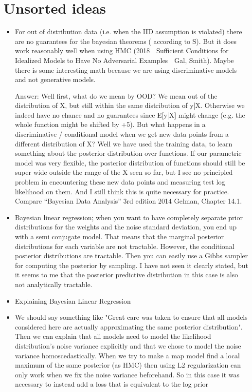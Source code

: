 \documentclass[12pt, A4, twoside]{report}
\begin{document}
\chapter{Unsorted ideas}
\begin{itemize}
  \item For out of distribution data (i.e. when the IID assumption is violated) there are no guarantees for the bayesian theorems ( according to S). But it does work reasonably well when using HMC (2018 | Sufficient Conditions for Idealized Models to Have No Adversarial Examples | Gal, Smith). Maybe there is some interesting math because we are using discriminative models and not generative models.
  
  Answer:
  Well first, what do we mean by OOD? We mean out of the distribution of X, but still within the same distribution of y|X. Otherwise we indeed have no chance and no guarantees since E[y|X] might change (e.g. the whole function might be shifted by +5). But what happens in a discriminative / conditional model when we get new data points from a different distribution of X? Well we have used the training data, to learn something about the posterior distribution over functions. If our parametric model was very flexible, the posterior distribution of functions should still be super wide outside the range of the X seen so far, but I see no principled problem in encountering these new data points and measuring test log likelihood on them. And I still think this is quite necessary for practice. Compare “Bayesian Data Analysis” 3rd edition 2014 Gelman, Chapter 14.1.
  \item Bayesian linear regression; when you want to have completely separate prior distributions for the weights and the noise standard deviation, you end up with a semi conjugate model. That means that the marginal posterior distributions for each variable are not tractable. However, the conditional posterior distributions are tractable. Then you can easily use a Gibbs sampler for computing the posterior by sampling. I have not seen it clearly stated, but it seems to me that the posterior predictive distribution in this case is also not analytically tractable.
  \item Explaining Bayesian Linear Regression
  \item We should say something like "Great care was taken to ensure that all models considered here are actually approximating the same posterior distribution". Then we can explain that all models need to model the likelihood distribution's noise variance explicitly and that we chose to model the noise variance homoscedastically. When we try to make a map model find a local maximum of the same posterior (as HMC) then using L2 regularization can only work when we fix the noise variance beforehand. So in this case it was necessary to instead add a loss that is equivalent to the log prior

\end{itemize}
\end{document}
